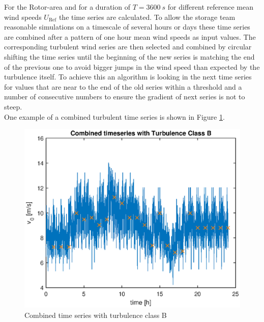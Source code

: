 For the Rotor-area and for a duration of $T = \SI{3600}{s}$ for different reference mean wind speeds $U_{\text{Ref}}$ the time series are calculated. To allow the storage team reasonable simulations on a timescale of several hours or days these time series are combined after a pattern of one hour mean wind speeds as input values. The corresponding turbulent wind series are then selected and combined by circular shifting the time series until the beginning of the new series is matching the end of the previous one to avoid bigger jumps in the wind speed than expected by the turbulence itself. To achieve this an algorithm is looking in the next time series for values that are near to the end of the old series within a threshold and a number of consecutive numbers to ensure the gradient of next series is not to steep. \\
One example of a combined turbulent time series is shown in Figure \ref{fig:TurbWindField}.
\begin{figure}[tbh]
	\centering	
	\includegraphics[width=12cm]{Figures/TurbWindField.eps}
	\caption{Combined time series with turbulence class B}
	\label{fig:TurbWindField}
\end{figure}    
